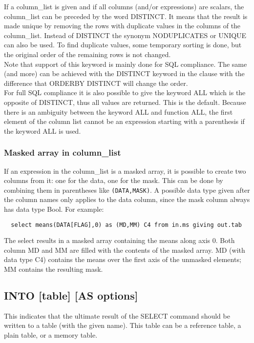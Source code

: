 If a column\_list is given and if all columns (and/or expressions) are
scalars, the column\_list can be preceded by the word DISTINCT.
It means that the result is made unique by removing the rows
with duplicate values in the columns of the column\_list.
Instead of DISTINCT the synonym NODUPLICATES or UNIQUE can also
be used.
To find duplicate values, some temporary sorting is done,
but the original order of the remaining rows is not changed.
\\Note that support of this keyword is mainly done for SQL
compliance. The same (and more) can be achieved with the
DISTINCT keyword in the  clause
with the difference that ORDERBY DISTINCT will change the order.
\\For full SQL compliance it is also possible to give the keyword
ALL which is the opposite of DISTINCT, thus all values are
returned. This is the default. Because there is an ambiguity between
the keyword ALL and function ALL, the first element of the column
list cannot be an expression starting with a parenthesis if the
keyword ALL is used.

\subsubsection{Masked array in column\_list}
If an expression in the column\_list is a masked array, it is possible
to create two columns from it: one for the data, one for the
mask. This can be done by combining them in parentheses like {\tt (DATA,MASK)}. 
A possible data type given after the column names only applies to the
data column, since the mask column always has data type Bool.
For example:
\begin{verbatim}
  select means(DATA[FLAG],0) as (MD,MM) C4 from in.ms giving out.tab
\end{verbatim}
The select results in a masked array containing the means along axis 0.
Both column MD and MM are filled with the contents of the masked
array. MD (with data type C4) contains the means over the first axis
of the unmasked elements; MM contains the resulting mask.

\subsection{\label{TAQL:INTO}INTO [table] [AS options]}
This indicates that the ultimate result of the SELECT command should be
written to a table (with the given name). This table can be a
reference table, a plain table, or a memory table.

